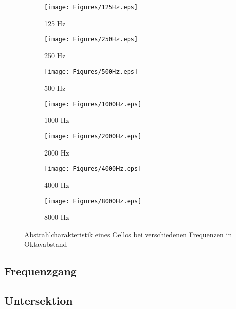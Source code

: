\begin{figure}[bth]
    \centering
    \begin{subfigure}{.5\textwidth}
        \centering
        \caption{125 Hz}
        \texttt{[image: Figures/125Hz.eps]}
    \end{subfigure}%
    \begin{subfigure}{.5\textwidth}
        \centering
        \caption{250 Hz}
        \texttt{[image: Figures/250Hz.eps]}
    \end{subfigure}

    \begin{subfigure}{.5\textwidth}
        \centering
        \caption{500 Hz}
        \texttt{[image: Figures/500Hz.eps]}
    \end{subfigure}%
    \begin{subfigure}{.5\textwidth}
        \centering
        \caption{1000 Hz}
        \texttt{[image: Figures/1000Hz.eps]}
    \end{subfigure}

    \begin{subfigure}{.5\textwidth}
        \centering
        \caption{2000 Hz}
        \texttt{[image: Figures/2000Hz.eps]}
    \end{subfigure}%
    \begin{subfigure}{.5\textwidth}
        \centering
        \caption{4000 Hz}
        \texttt{[image: Figures/4000Hz.eps]}
    \end{subfigure}

    \begin{subfigure}{.5\textwidth}
        \centering
        \caption{8000 Hz}
        \texttt{[image: Figures/8000Hz.eps]}
    \end{subfigure}

    \caption{Abstrahlcharakteristik eines Cellos bei verschiedenen Frequenzen in Oktavabstand}
    \label{fig:balloon}
\end{figure}


\subsection{Frequenzgang}
\label{subsec:b}
\blindtext


\subsection{Untersektion}
\label{subsec:c}
